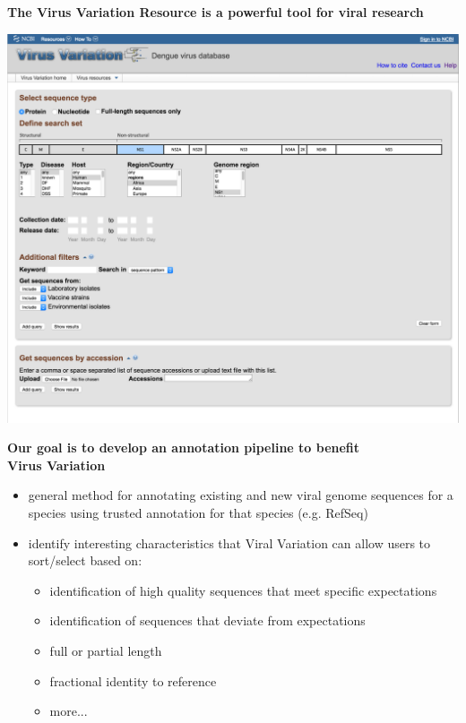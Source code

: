 \documentclass[landscape]{slides}
\begin{document}
\begin{slide}
\begin{center}
\textbf{The Virus Variation Resource is a powerful tool for viral research}

\includegraphics[width=8in]{figs/viv-dengue-query}

\vfill
\end{center}
\end{slide}
\begin{slide}
\begin{center}
\textbf{Our goal is to develop an annotation pipeline to benefit \\ Virus Variation}

\small
\begin{itemize}
\item general method for annotating existing and new viral genome
  sequences for a species using trusted annotation for that species (e.g. RefSeq)
\item identify interesting characteristics that Viral Variation can
  allow users to sort/select based on:
\begin{itemize}
  \item identification of high quality sequences that meet specific expectations
  \item identification of sequences that deviate from expectations
  \item full or partial length
  \item fractional identity to reference
  \item more...
\end{itemize}
\end{itemize}

\end{center}
\vfill
\end{slide}
\end{document}
